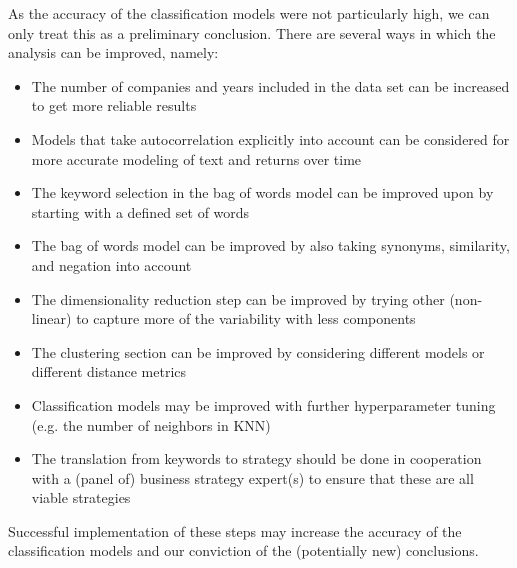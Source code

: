 \documentclass{article}
\begin{document}
As the accuracy of the classification models were not particularly high, we can only treat this as a preliminary conclusion. There are several ways in which the analysis can be improved, namely:
\begin{itemize}
    \item The number of companies and years included in the data set can be increased to get more reliable results
    \item Models that take autocorrelation explicitly into account can be considered for more accurate modeling of text and returns over time
    \item The keyword selection in the bag of words model can be improved upon by starting with a defined set of words
    \item The bag of words model can be improved by also taking synonyms, similarity, and negation into account
    \item The dimensionality reduction step can be improved by trying other (non-linear) to capture more of the variability with less components
    \item The clustering section can be improved by considering different models or different distance metrics
    \item Classification models may be improved with further hyperparameter tuning (e.g. the number of neighbors in KNN)
    \item The translation from keywords to strategy should be done in cooperation with a (panel of) business strategy expert(s) to ensure that these are all viable strategies
\end{itemize}
Successful implementation of these steps may increase the accuracy of the classification models and our conviction of the (potentially new) conclusions.


\clearpage
\end{document}
